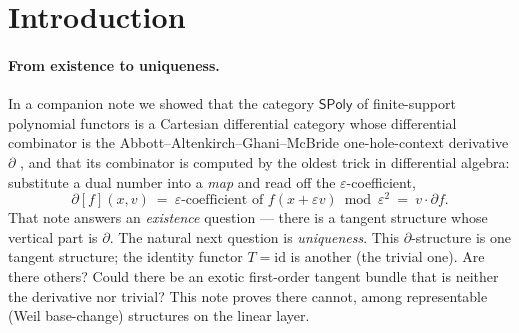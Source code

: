 \documentclass[11pt]{article}
\theoremstyle{definition}
\newcommand{\SPoly}{\mathsf{SPoly}}
\newcommand{\Poly}{\mathsf{Poly}}
\newcommand{\N}{\mathbb{N}}
\newcommand{\id}{\mathrm{id}}
\begin{document}
\begin{abstract}
principal-ideal hypothesis and no subtraction. Crucially, on the linear layer base change $\otimes D$
coincides with container substitution $\lhd$ (and with the Dirichlet tensor), so the classification
is at once a statement about Weil base change and about the container derivative --- but it is
\emph{not} a statement about $\lhd$-substitution on all of $\Poly$, where there is no
$\varepsilon^2=0$ truncation ($y^2\lhd 2y=4y^2$) and only $T=\id$ survives. The uniqueness holds for
a free infinitesimal part of \emph{any} rank. Finiteness is \emph{not} load-bearing: although
$M=\N\cdot y$ is \emph{abstractly} solid, because $|\N\times\N|=|\N|$ supplies an abstract
isomorphism $M\otimes M\cong M$, abstract solidity is strictly weaker than underlying a tangent
structure at infinite rank --- the flip and
lift-coassociativity axioms force the vertical lift to be the diagonal, which is surjective only in
rank $\le 1$, so $\N\cdot y$ is \emph{not} a tangent structure (an earlier draft's ``finiteness is
sharp'' claim, which measured solidity by an abstract isomorphism, is withdrawn). The uniqueness
answers, and sharpens, a question of Cockett (2012).
\end{abstract}

\section{Introduction}\label{sec:intro}

\paragraph{From existence to uniqueness.}
In a companion note \cite{MacBethTangent} we showed that the category $\SPoly$ of finite-support
polynomial functors is a Cartesian differential category whose differential combinator is the
Abbott--Altenkirch--Ghani--McBride one-hole-context derivative $\partial$ \cite{AAGM2003}, and that
its combinator is computed by the oldest trick in differential algebra: substitute a dual number
into a \emph{map} and read off the $\varepsilon$-coefficient,
\[
  \partial[f](x,v)\ =\ \varepsilon\text{-coefficient of } f(x+\varepsilon v)\bmod\varepsilon^2
  \ =\ v\cdot\partial f.
\]
That note answers an \emph{existence} question --- there is a tangent structure whose vertical part
is $\partial$. The natural next question is \emph{uniqueness}. This $\partial$-structure is one
tangent structure; the identity functor $T=\id$ is another (the trivial one). Are there others?
Could there be an exotic first-order tangent bundle that is neither the derivative nor trivial? This
note proves there cannot, among representable (Weil base-change) structures on the linear layer.
\end{document}
